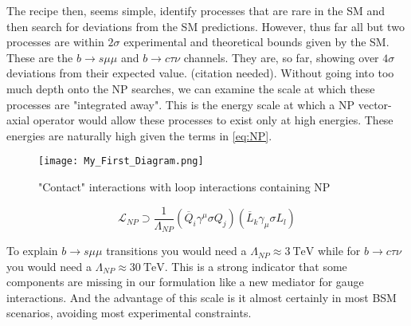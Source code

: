 The recipe then, seems simple, identify processes that are rare in the SM and then search for deviations from the SM predictions. However, thus far all but two processes are within $2\sigma$ experimental and theoretical bounds given by the SM. 
%
These are the $b \rightarrow s \mu \mu$ and $b \rightarrow c \tau \nu$ channels. They are, so far, showing over $ 4 \sigma$ deviations from their expected value. {\color{blue} (citation needed)}.
%
Without going into too much depth onto the NP searches, we can examine the scale at which these processes are "integrated away". This is the energy scale at which a NP vector-axial operator would allow these processes to exist only at high energies. These energies are naturally high given the terms in \ref{eq:NP}. 
%
\bigbreak
%
\noindent\begin{minipage}{.3\textwidth}
	\begin{figure}[H]
		\label{fig:contactNP}
		\centering
		\texttt{[image: My\_First\_Diagram.png]}
		\caption{"Contact" interactions with loop interactions containing NP}
	\end{figure}
\end{minipage}
\begin{minipage}{.6\textwidth}
\begin{equation}
\label{eq:NP}
\mathcal{L}_{NP} \supset \frac{1}{\Lambda_{NP}} (\overline{Q}_i \gamma^\mu \sigma Q_j ) (\overline{L}_k \gamma_\mu \sigma L_l) 
\end{equation}
\end{minipage}
%
\bigbreak
%
To explain $b \rightarrow s \mu \mu$ transitions you would need a $\Lambda_{NP} \approx 3 \ \text{TeV}$ while for $b \rightarrow c \tau \nu$ you would need a $\Lambda_{NP} \approx 30\ \text{TeV}$. This is a strong indicator that some components are missing in our formulation like a new mediator for gauge interactions. And the advantage of this scale is it almost certainly in most BSM scenarios, avoiding most experimental constraints.

